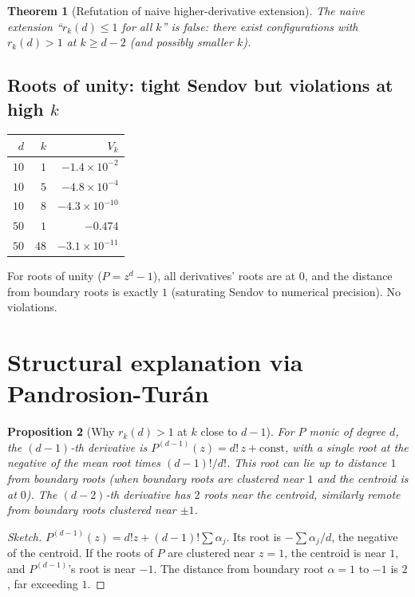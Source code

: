 \documentclass[11pt,a4paper]{article}
\newtheorem{theorem}{Theorem}[section]
\newtheorem{proposition}[theorem]{Proposition}
\begin{document}
\begin{theorem}[Refutation of naive higher-derivative extension]\label{thm:refute}
The naive extension ``$r_k(d) \le 1$ for all $k$'' is false: there exist
configurations with $r_k(d) > 1$ at $k \ge d - 2$ (and possibly smaller $k$).
\end{theorem}

\subsection{Roots of unity: tight Sendov but violations at high $k$}

\begin{center}
\begin{tabular}{rrr}
\toprule
$d$ & $k$ & $V_k$ \\
\midrule
$10$ & $1$ & $-1.4 \times 10^{-2}$ \\
$10$ & $5$ & $-4.8 \times 10^{-4}$ \\
$10$ & $8$ & $-4.3 \times 10^{-10}$ \\
$50$ & $1$ & $-0.474$ \\
$50$ & $48$ & $-3.1 \times 10^{-11}$ \\
\bottomrule
\end{tabular}
\end{center}

For roots of unity ($P = z^d - 1$), all derivatives' roots are at $0$, and the
distance from boundary roots is exactly $1$ (saturating Sendov to numerical
precision). No violations.

\section{Structural explanation via Pandrosion-Turán}\label{sec:structural}

\begin{proposition}[Why $r_k(d) > 1$ at $k$ close to $d - 1$]\label{prop:why}
For $P$ monic of degree $d$, the $(d-1)$-th derivative is
$P^{(d-1)}(z) = d!\, z + \text{const}$, with a single root at the negative of the
mean root times $(d-1)!/d!$. This root can lie up to distance $1$ from boundary
roots (when boundary roots are clustered near $1$ and the centroid is at $0$).
The $(d-2)$-th derivative has $2$ roots near the centroid, similarly remote
from boundary roots clustered near $\pm 1$.
\end{proposition}

\begin{proof}[Sketch]
$P^{(d-1)}(z) = d! z + (d-1)! \sum \alpha_j$. Its root is
$-\sum \alpha_j / d$, the negative of the centroid. If the roots of $P$ are
clustered near $z = 1$, the centroid is near $1$, and $P^{(d-1)}$'s root is
near $-1$. The distance from boundary root $\alpha = 1$ to $-1$ is $2$, far
exceeding $1$.
\end{proof}
\end{document}
